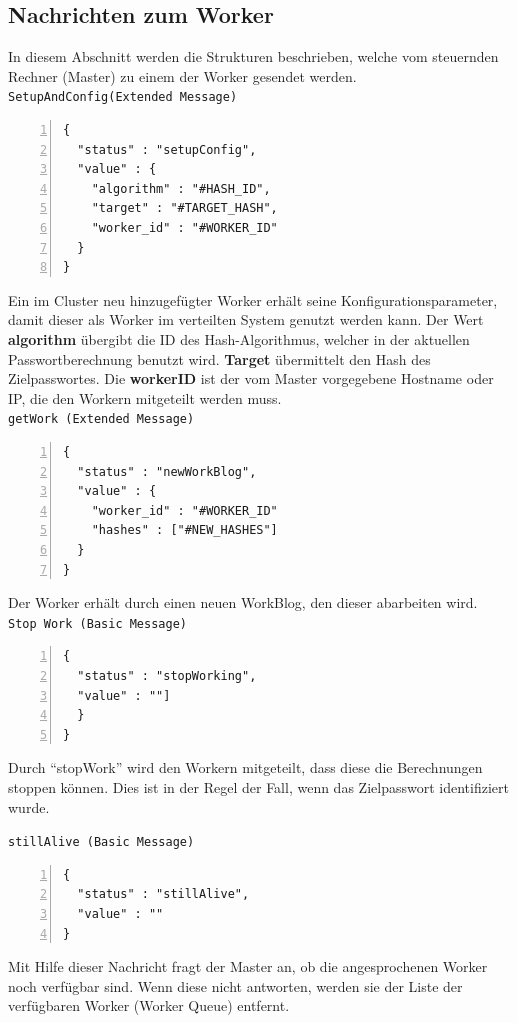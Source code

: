 \subsection{Nachrichten zum Worker}
In diesem Abschnitt werden die Strukturen beschrieben, welche vom steuernden Rechner (Master) zu einem der Worker gesendet werden.\\

\texttt{SetupAndConfig(Extended Message)}
\begin{lstlisting}[basicstyle=\ttfamily,numbers=left,numberstyle=\footnotesize\ttfamily,backgroundcolor=\color{sourcegray}]
{
  "status" : "setupConfig",
  "value" : {
    "algorithm" : "#HASH_ID",
    "target" : "#TARGET_HASH", 
    "worker_id" : "#WORKER_ID"
  }
}
\end{lstlisting}
Ein im Cluster neu hinzugefügter Worker erhält seine Konfigurationsparameter, damit dieser als Worker im verteilten System genutzt werden kann. 
Der Wert \textbf{algorithm} übergibt die ID des Hash-Algorithmus, welcher in der aktuellen Passwortberechnung benutzt wird. \textbf{Target} übermittelt den Hash des Zielpasswortes. Die \textbf{workerID} ist der vom Master vorgegebene Hostname oder IP, die den Workern mitgeteilt werden muss.\\

\texttt{getWork (Extended Message)}
\begin{lstlisting}[basicstyle=\ttfamily,numbers=left,numberstyle=\footnotesize\ttfamily,backgroundcolor=\color{sourcegray}]
{
  "status" : "newWorkBlog",
  "value" : {
    "worker_id" : "#WORKER_ID"
    "hashes" : ["#NEW_HASHES"]
  }
}
\end{lstlisting}
Der Worker erhält durch einen neuen WorkBlog, den dieser abarbeiten wird.\\

\texttt{Stop Work (Basic Message)}
\begin{lstlisting}[basicstyle=\ttfamily,numbers=left,numberstyle=\footnotesize\ttfamily,backgroundcolor=\color{sourcegray}]
{
  "status" : "stopWorking",
  "value" : ""]
  }
}
\end{lstlisting}
Durch \enquote{stopWork} wird den Workern mitgeteilt, dass diese die Berechnungen stoppen können. Dies ist in der Regel der Fall, wenn das Zielpasswort identifiziert wurde. 


\texttt{stillAlive (Basic Message)}
\begin{lstlisting}[basicstyle=\ttfamily,numbers=left,numberstyle=\footnotesize\ttfamily,backgroundcolor=\color{sourcegray}]
{
  "status" : "stillAlive",
  "value" : ""
}
\end{lstlisting}
Mit Hilfe dieser Nachricht fragt der Master an, ob die angesprochenen Worker noch verfügbar sind. Wenn diese nicht antworten, werden sie der Liste der verfügbaren Worker (Worker Queue) entfernt. 

